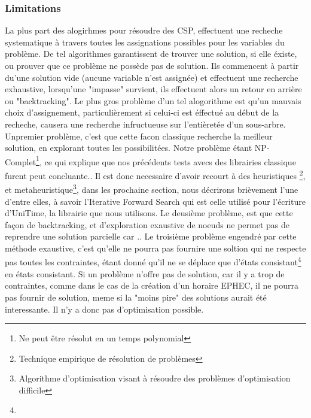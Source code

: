 \subsubsection{Limitations}
La plus part des alogirhmes pour résoudre des CSP, effectuent une recheche systematique à travers toutes les assignations possibles pour les variables du problème. De tel algorithmes garantissent de trouver une solution, si elle éxiste, ou prouver que ce problème ne possède pas de solution.  
Ils commencent à partir du'une solution vide (aucune variable n'est assignée) et effectuent une recherche exhaustive,
lorsqu'une "impasse" survient, ils effectuent alors un retour en arrière ou "backtracking".  
Le plus gros problème d'un tel alogorithme est qu'un mauvais choix d'assignement,
 particulièrement si celui-ci est éffectué au début de la recheche, causera une recherche infructueuse sur l'entièretée d'un sous-arbre. 
\newline
\indent
Unpremier problème, c'est que cette facon classique recherche la meilleur solution, en explorant toutes les possibilitées. Notre problème étant NP-Complet\footnote{Ne peut être résolut en un temps polynomial}, ce qui explique que nos précédents tests avecs des librairies classique furent peut concluante.\newline.
Il est donc necessaire d'avoir recourt à des heuristiques \footnote{Technique empirique de résolution de problèmes}, 
et metaheuristique\footnote{Algorithme d’optimisation visant à résoudre des problèmes d’optimisation difficile }, dans les prochaine section, nous décrirons brièvement l'une d'entre elles, à savoir l'Iterative Forward Search qui est celle utilisé pour l'écriture d'UniTime, la librairie que nous utilisons.
\newline
\indent
Le deusième problème, est que cette façon de backtracking, et d'exploration exaustive de noeuds ne permet pas de reprendre une solution parcielle car ..
\newline
\indent
Le troisième problème engendré par cette méthode exaustive, c'est qu'elle ne pourra pas fournire une soltion qui ne respecte pas toutes les contraintes, étant donné qu'il ne se déplace que d'états consistant\footnote{} en états consistant. Si un problème n'offre pas de solution, car il y a trop de contraintes, comme dans le cas de la création d'un horaire EPHEC, il ne pourra pas fournir de solution, meme si la "moins pire" des solutions aurait été interessante. Il n'y a donc pas d'optimisation possible.
\newline
